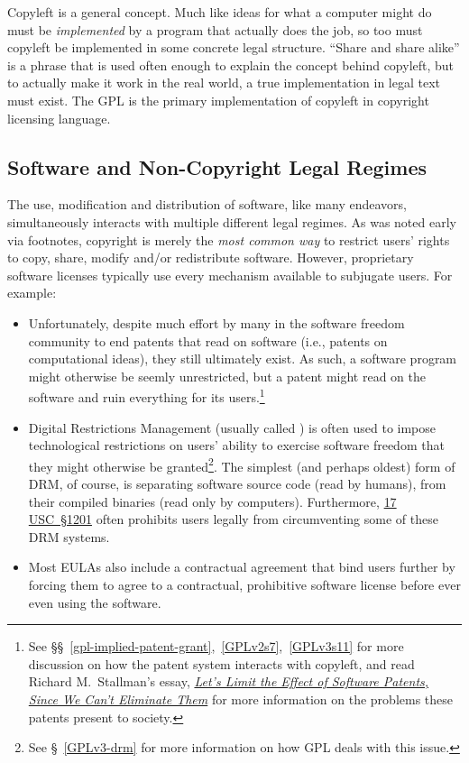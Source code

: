 Copyleft is a general concept. Much like ideas for what a computer might
do must be \emph{implemented} by a program that actually does the job, so
too must copyleft be implemented in some concrete legal structure.
``Share and share alike'' is a phrase that is used often enough to explain the
concept behind copyleft, but to actually make it work in the real world, a
true implementation in legal text must exist. The GPL is the primary
implementation of copyleft in copyright licensing language.

\subsection{Software and Non-Copyright Legal Regimes}
\label{software-and-non-copyright}

The use, modification and distribution of software, like many endeavors,
simultaneously interacts with multiple different legal regimes.  As was noted
early via footnotes, copyright is merely the \textit{most common way} to
restrict users' rights to copy, share, modify and/or redistribute software.
However, proprietary software licenses typically use every mechanism
available to subjugate users.  For example:

\begin{itemize}

\item Unfortunately, despite much effort by many in the software freedom
  community to end patents that read on software (i.e., patents on
  computational ideas), they still ultimately exist.  As such, a software
  program might otherwise be seemly unrestricted, but a patent might read on
  the software and ruin everything for its users.\footnote{See
  \S\S~\ref{gpl-implied-patent-grant},~\ref{GPLv2s7},~\ref{GPLv3s11} for more
  discussion on how the patent system interacts with copyleft, and read
  Richard M.~Stallman's essay,
  \href{http://www.wired.com/opinion/2012/11/richard-stallman-software-patents/}{\textit{Let's
      Limit the Effect of Software Patents, Since We Can't Eliminate Them}}
  for more information on the problems these patents present to society.}

\item Digital Restrictions Management (usually called ) is often
  used to impose technological restrictions on users' ability to exercise
  software freedom that they might otherwise be granted\footnote{See
    \S~\ref{GPLv3-drm} for more information on how GPL deals with this issue.}.
  The simplest (and perhaps oldest) form of DRM, of course, is separating
  software source code (read by humans), from their compiled binaries (read
  only by computers).  Furthermore,
  \href{http://www.law.cornell.edu/uscode/text/17/1201}{17 USC~\S1201} often
  prohibits users legally from circumventing some of these DRM systems.

\item Most EULAs also include a contractual agreement that bind users further
  by forcing them to agree to a contractual, prohibitive software license
  before ever even using the software.

\end{itemize}

